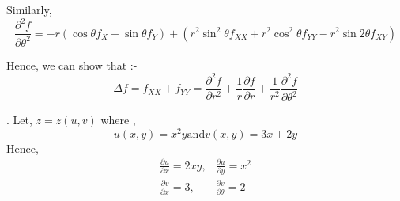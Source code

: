 \documentclass[Analysis-3]{subfiles}
\begin{document}
Similarly, \[ \boxed{\frac{\partial^2 f}{\partial \theta^2 } = -r \left( \cos \theta f_X + \sin \theta f_Y \right) + \left( r^2\sin^2 \theta f_{XX} + r^2\cos^2 \theta f_{YY} - r^2\sin 2 \theta f_{XY} \right)} \]

Hence, we can show that :- 
\[ \boxed{\Delta f = f_{XX} + f_{YY} = \frac{\partial^2 f}{\partial r^2} + \frac{1}{r} \frac{\partial f}{\partial r} + \frac{1}{r^2} \frac{\partial^2 f}{\partial \theta^2}} \]

\begin{Eg}{}
	. Let, $z = z(u,v)$ where , \[ u(x,y) = x^2y \text{and} v(x,y) = 3x + 2y \]
	Hence, \[\begin{matrix}
		\frac{\partial u}{\partial x} = 2xy , & \frac{\partial u}{\partial y} = x^2 \\
		\frac{\partial v}{\partial x} = 3 , & \frac{\partial v}{\partial \theta} = 2
	\end{matrix}\]


\end{Eg}
\end{document}

